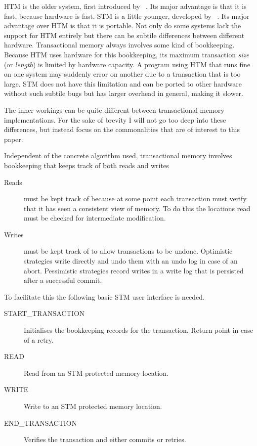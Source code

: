 HTM is the older system, first introduced by
\citeauthor{tm-origins}~\cite{tm-origins}. Its major advantage is that it is
fast, because hardware is fast. STM is a little younger, developed by
\citeauthor{stm}~\cite{stm}. Its major advantage over HTM is that it is
portable. Not only do some systems lack the support for HTM entirely but there
can be subtile differences between different hardware. Transactional memory
always involves some kind of bookkeeping. Because HTM uses hardware for this
bookkeeping, its maximum transaction \emph{size} (or \emph{length}) is limited
by hardware capacity. A program using HTM that runs fine on one system may
suddenly error on another due to a transaction that is too large. STM does not
have this limitation and can be ported to other hardware without such subtile
bugs but has larger overhead in general, making it slower.

The inner workings can be quite different between transactional memory
implementations. For the sake of brevity I will not go too deep into these differences,
but instead focus on the commonalities that are of interest to this paper.

Independent of the concrete algorithm used, transactional memory involves
bookkeeping that keeps track of both reads and writes
\begin{description}
\item[Reads] must be kept track of because at some point each transaction must verify
that it has seen a consistent view of memory. To do this the locations read must
be checked for intermediate modification.
\item[Writes] must be kept track of to allow transactions to be undone.
  Optimistic strategies write directly and undo them with an undo log in case of
  an abort. Pessimistic strategies record writes in a write log that is
  persisted after a successful commit.
\end{description}

To facilitate this the following basic STM user interface is needed.
\begin{description}
\item[START\_TRANSACTION] Initialises the bookkeeping records for the
  transaction. Return point in case of a retry.
\item[READ] Read from an STM protected memory location.
\item[WRITE] Write to an STM protected memory location.
\item[END\_TRANSACTION] Verifies the transaction and either commits or retries.
\end{description}

